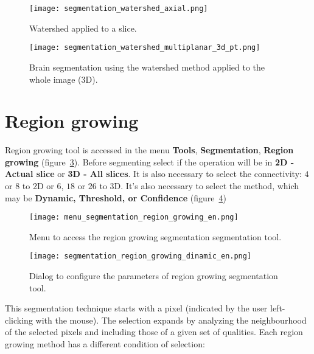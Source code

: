 \begin{figure}[!htb]
\centering
\texttt{[image: segmentation\_watershed\_axial.png]}
\caption{Watershed applied to a slice.}
\label{fig:watershed_2d}
\end{figure}

\begin{figure}[!htb]
\centering
\texttt{[image: segmentation\_watershed\_multiplanar\_3d\_pt.png]}
\caption{Brain segmentation using the watershed method applied to the whole image (3D).}
\label{fig:watershed_3d}
\end{figure}

\section{Region growing}

Region growing tool is accessed in the menu \textbf{Tools}, \textbf{Segmentation}, \textbf{Region growing} (figure~\ref{fig:menu_segmentation_region_growing}). Before segmenting select if the operation will be in \textbf{2D - Actual slice} or \textbf{3D - All slices}. It is also necessary to select the connectivity: $4$ or $8$ to 2D or $6$, $18$ or $26$ to 3D. It's also necessary to select the method, which may be \textbf{Dynamic, Threshold, or Confidence} (figure~\ref{fig:segmentation_region_growing_dinamic})

\begin{figure}[!htb]
    \centering
    \texttt{[image: menu\_segmentation\_region\_growing\_en.png]}
    \caption{Menu to access the region growing segmentation segmentation tool.}
    \label{fig:menu_segmentation_region_growing}
\end{figure}

\begin{figure}[!htb]
    \centering
    \texttt{[image: segmentation\_region\_growing\_dinamic\_en.png]}
    \caption{Dialog to configure the parameters of region growing segmentation tool.}
    \label{fig:segmentation_region_growing_dinamic}
\end{figure}

This segmentation technique starts with a pixel (indicated by the user left-clicking with the mouse). The selection expands by analyzing the neighbourhood of the selected pixels and including those of a given set of qualities. Each region growing method has a different condition of selection:

